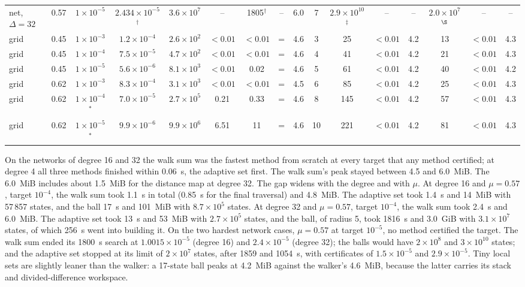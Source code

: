 \documentclass[aps,pra,superscriptaddress,floatfix,longbibliography,twocolumn]{revtex4-2}
\begin{document}
\begin{table}[t]
\begin{ruledtabular}
\begin{tabular}{lcc|cccccc|cccc|ccc}
net, $\Delta=32$ & 0.57 & $1\times10^{-5}$ & $2.434\times10^{-5}$$^{\dagger}$ & $3.6\times10^{7}$ & -- & 1805$^{\dagger}$ & -- & 6.0 & 7 & $2.9\times10^{10}$$^{\ddagger}$ & -- & -- & $2.0\times10^{7}$$^{\S}$ & -- & -- \\
grid & 0.45 & $1\times10^{-3}$ & $1.2\times10^{-4}$ & $2.6\times10^{2}$ & $<0.01$ & $<0.01$ & = & 4.6 & 3 & 25 & $<0.01$ & 4.2 & 13 & $<0.01$ & 4.3 \\
grid & 0.45 & $1\times10^{-4}$ & $7.5\times10^{-5}$ & $4.7\times10^{2}$ & $<0.01$ & $<0.01$ & = & 4.6 & 4 & 41 & $<0.01$ & 4.2 & 21 & $<0.01$ & 4.3 \\
grid & 0.45 & $1\times10^{-5}$ & $5.6\times10^{-6}$ & $8.1\times10^{3}$ & $<0.01$ & 0.02 & = & 4.6 & 5 & 61 & $<0.01$ & 4.2 & 40 & $<0.01$ & 4.2 \\
grid & 0.62 & $1\times10^{-3}$ & $8.3\times10^{-4}$ & $3.1\times10^{3}$ & $<0.01$ & $<0.01$ & = & 4.5 & 6 & 85 & $<0.01$ & 4.2 & 25 & $<0.01$ & 4.3 \\
grid & 0.62 & $1\times10^{-4}$$^*$ & $7.0\times10^{-5}$ & $2.7\times10^{5}$ & 0.21 & 0.33 & = & 4.6 & 8 & 145 & $<0.01$ & 4.2 & 57 & $<0.01$ & 4.3 \\
grid & 0.62 & $1\times10^{-5}$$^*$ & $9.9\times10^{-6}$ & $9.9\times10^{6}$ & 6.51 & 11 & = & 4.6 & 10 & 221 & $<0.01$ & 4.2 & 81 & $<0.01$ & 4.3 \\
\end{tabular}
\end{ruledtabular}
\end{table}

On the networks of degree 16 and 32 the walk sum was the fastest method from scratch at every target that any method certified; at degree 4 all three methods finished within 0.06~s, the adaptive set first. The walk sum's peak stayed between 4.5 and 6.0~MiB. The 6.0~MiB includes about 1.5~MiB for the distance map at degree 32. The gap widens with the degree and with $\mu$. At degree 16 and $\mu=0.57$, target $10^{-4}$, the walk sum took 1.1~s in total (0.85~s for the final traversal) and 4.8~MiB. The adaptive set took 1.4~s and 14~MiB with 57\,857 states, and the ball 17~s and 101~MiB with $8.7\times10^5$ states. At degree 32 and $\mu=0.57$, target $10^{-4}$, the walk sum took 2.4~s and 6.0~MiB. The adaptive set took 13~s and 53~MiB with $2.7\times10^5$ states, and the ball, of radius 5, took 1816~s and 3.0~GiB with $3.1\times10^7$ states, of which 256~s went into building it. On the two hardest network cases, $\mu=0.57$ at target $10^{-5}$, no method certified the target. The walk sum ended its 1800~s search at $1.0015\times10^{-5}$ (degree 16) and $2.4\times10^{-5}$ (degree 32); the balls would have $2\times10^8$ and $3\times10^{10}$ states; and the adaptive set stopped at its limit of $2\times10^7$ states, after 1859 and 1054~s, with certificates of $1.5\times10^{-5}$ and $2.9\times10^{-5}$. Tiny local sets are slightly leaner than the walker: a 17-state ball peaks at 4.2~MiB against the walker's 4.6~MiB, because the latter carries its stack and divided-difference workspace.
\end{document}
